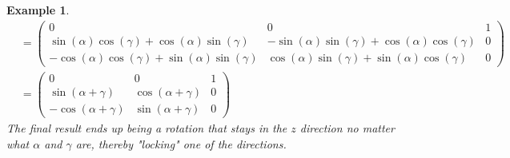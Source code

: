 \documentclass[12pt, letterpaper, onecolumn, conference, final]{IEEEtran}
\theoremstyle{definition}
\newtheorem{proposition}{Proposition}
\theoremstyle{plain}
\newtheorem{example}{Example}
\begin{document}
\begin{example}
\begin{equation*}
\begin{split}
&= \begin{pmatrix}
0 & 0 & 1 \\
\sin(\alpha)\cos(\gamma) + \cos(\alpha)\sin(\gamma) & -\sin(\alpha)\sin(\gamma) + \cos(\alpha)\cos(\gamma) & 0 \\
-\cos(\alpha)\cos(\gamma) + \sin(\alpha)\sin(\gamma) & \cos(\alpha)\sin(\gamma) + \sin(\alpha)\cos(\gamma) & 0
\end{pmatrix} \\
&= \begin{pmatrix}
0 & 0 & 1 \\
\sin(\alpha + \gamma) & \cos(\alpha + \gamma) & 0 \\
-\cos(\alpha + \gamma) & \sin(\alpha + \gamma) & 0
\end{pmatrix}
\end{split}
\end{equation*}
The final result ends up being a rotation that stays in the $z$ direction no matter what $\alpha$ and $\gamma$ are, thereby "locking" one of the directions.
\end{example}

\newpage
\begin{center}
\end{center}
\end{document}
